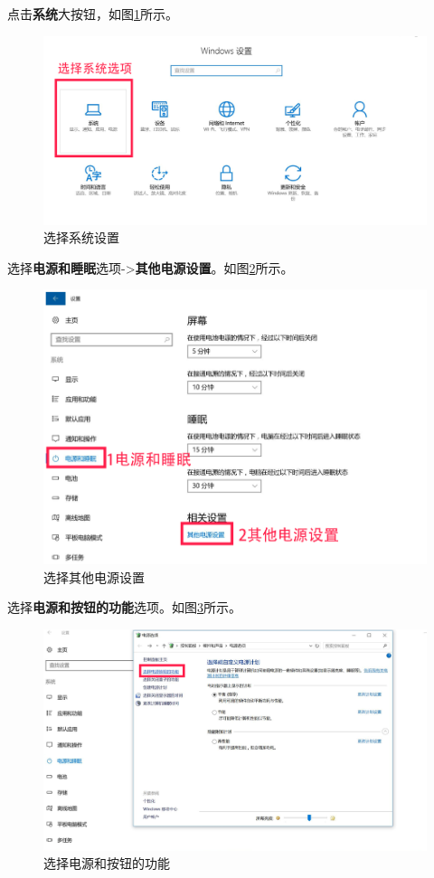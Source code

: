 \documentclass[doctor,openright,twoside]{sjtuthesis}
\theoremstyle{plain}
\theoremstyle{definition}
\theoremstyle{remark}
\theoremstyle{ocrenumbox}
\theoremstyle{plain}
\begin{document}
点击\textbf{系统}大按钮，如图\ref{win10-qidong-02}所示。

\begin{figure}
\centering
\includegraphics{images/win10-qidong-02.png}
\caption{选择系统设置\label{win10-qidong-02}}
\end{figure}

选择\textbf{电源和睡眠}选项-\textgreater{}\textbf{其他电源设置}。如图\ref{win10-qidong-03}所示。

\begin{figure}
\centering
\includegraphics{images/win10-qidong-03.png}
\caption{选择其他电源设置\label{win10-qidong-03}}
\end{figure}

选择\textbf{电源和按钮的功能}选项。如图\ref{win10-qidong-04}所示。

\begin{figure}
\centering
\includegraphics{images/win10-qidong-04.png}
\caption{选择电源和按钮的功能\label{win10-qidong-04}}
\end{figure}
\end{document}
